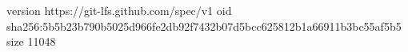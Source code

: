 version https://git-lfs.github.com/spec/v1
oid sha256:5b5b23b790b5025d966fe2db92f7432b07d5bcc625812b1a66911b3bc55af5b5
size 11048
